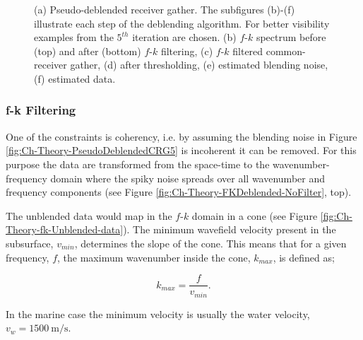 \begin{figure}
\begin{subfigure}[t]{0.25\textwidth}
		\caption{}
		\label{fig:Ch-Theory-Deblended}
	\end{subfigure}
	\caption{(a) Pseudo-deblended receiver gather. The subfigures (b)-(f) illustrate each step of the deblending algorithm. For better visibility examples from the $5^{th}$ iteration are chosen. (b) $f$-$k$ spectrum before (top) and after (bottom) $f$-$k$ filtering, (c) $f$-$k$ filtered common-receiver gather, (d) after thresholding, (e) estimated blending noise, (f) estimated data.}
	\label{fig:Ch-Theory-IterativeDeblending}
\end{figure}


\subsubsection*{f-k Filtering}

One of the constraints is coherency, i.e. by assuming the blending noise in Figure \ref{fig:Ch-Theory-PseudoDeblendedCRG5} is incoherent it can be removed. For this purpose the data are transformed from the space-time to the wavenumber-frequency domain where the spiky noise spreads over all wavenumber and frequency components (see Figure \ref{fig:Ch-Theory-FKDeblended-NoFilter}, top). 


The unblended data would map in the $f$-$k$ domain in a cone (see Figure \ref{fig:Ch-Theory-fk-Unblended-data}). The minimum wavefield velocity present in the subsurface, $v_{min}$, determines the slope of the cone. This means that for a given frequency, $f$, the maximum wavenumber inside the cone, $k_{max}$, is defined as; 

\begin{equation}
	k_{max} = \frac{f}{v_{min}}.
	\label{eq_Ch-Theory-MaxWavenmber}
\end{equation} 

In the marine case the minimum velocity is usually the water velocity, $v_{w} = \SI{1500}{\metre\per\second}$.

